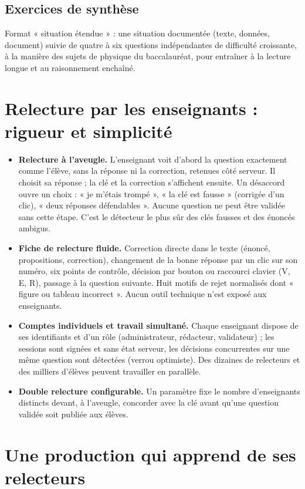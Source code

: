 \documentclass[11pt,a4paper]{article}
\begin{document}
\subsection{Exercices de synthèse}
Format « situation étendue » : une situation documentée (texte, données, document) suivie de quatre à six questions indépendantes de difficulté croissante, à la manière des sujets de physique du baccalauréat, pour entraîner à la lecture longue et au raisonnement enchaîné.

\section{Relecture par les enseignants : rigueur et simplicité}

\begin{itemize}
  \item \textbf{Relecture à l'aveugle.} L'enseignant voit d'abord la question exactement comme l'élève, sans la réponse ni la correction, retenues côté serveur. Il choisit sa réponse ; la clé et la correction s'affichent ensuite. Un désaccord ouvre un choix : « je m'étais trompé », « la clé est fausse » (corrigée d'un clic), « deux réponses défendables ». Aucune question ne peut être validée sans cette étape. C'est le détecteur le plus sûr des clés fausses et des énoncés ambigus.
  \item \textbf{Fiche de relecture fluide.} Correction directe dans le texte (énoncé, propositions, correction), changement de la bonne réponse par un clic sur son numéro, six points de contrôle, décision par bouton ou raccourci clavier (V, E, R), passage à la question suivante. Huit motifs de rejet normalisés dont « figure ou tableau incorrect ». Aucun outil technique n'est exposé aux enseignants.
  \item \textbf{Comptes individuels et travail simultané.} Chaque enseignant dispose de ses identifiants et d'un rôle (administrateur, rédacteur, validateur) ; les sessions sont signées et sans état serveur, les décisions concurrentes sur une même question sont détectées (verrou optimiste). Des dizaines de relecteurs et des milliers d'élèves peuvent travailler en parallèle.
  \item \textbf{Double relecture configurable.} Un paramètre fixe le nombre d'enseignants distincts devant, à l'aveugle, concorder avec la clé avant qu'une question validée soit publiée aux élèves.
\end{itemize}

\section{Une production qui apprend de ses relecteurs}
\end{document}
